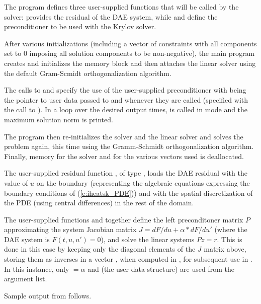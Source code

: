 The program defines three user-supplied functions that will be called by the
{\ida} solver:  provides the residual of the DAE system, while
 and  define the preconditioner to be used
with the Krylov solver.

After various initializations (including a vector of constraints with all components
set to $0$ imposing all solution components to be non-negative), the main program
creates and initializes the {\ida} memory block and then attaches the {\idaspgmr} linear
solver using the default  Gram-Scmidt orthogonalization algorithm. 

The calls to  and  specify
the use of the user-supplied preconditioner with  being the pointer to user data
passed to  and  whenever they are called (specified 
with the call to ).
In a loop over the desired output times,  is called in 
mode and the maximum solution norm is printed.

The  program then re-initializes the {\ida} solver and the {\idaspgmr} linear 
solver and solves the problem again, this time using the  Gramm-Schmidt
orthogonalization algorithm.
Finally, memory for the {\ida} solver and for the various vectors used is deallocated.

The user-supplied residual function , of type , loads the DAE
residual with the value of $u$ on the boundary (representing the algebraic equations
expressing the boundary conditions of (\ref{e:iheatsk_PDE})) and with the 
spatial discretization of the PDE (using central differences) in the rest of the domain.

The user-supplied functions  and  together define the 
left preconditoner matrix $P$ approximating the system Jacobian matrix               
$J = dF/du + \alpha*dF/du'$ (where the DAE system is $F(t,u,u') = 0$), and solve the linear   
systems $P z = r$.   This is done in this case by keeping only the diagonal elements of 
the $J$ matrix above, storing them as inverses in a vector , when computed in 
, for subsequent use in .                                 
In this instance, only  $=\alpha$ and  (the user data structure) are 
used from the  argument list.      

Sample output from  follows.
